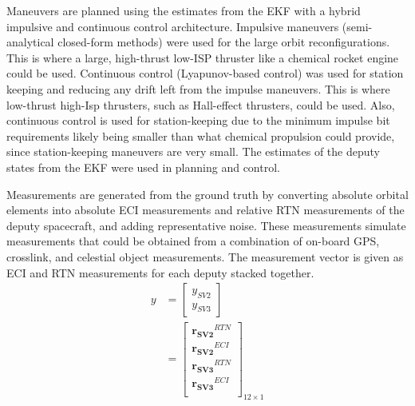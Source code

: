 Maneuvers are planned using the estimates from the EKF with a hybrid impulsive and continuous control architecture. Impulsive maneuvers (semi-analytical closed-form methods) were used for the large orbit reconfigurations. This is where a large, high-thrust low-ISP thruster like a chemical rocket engine could be used. Continuous control (Lyapunov-based control) was used for station keeping and reducing any drift left from the impulse maneuvers. This is where low-thrust high-Isp thrusters, such as Hall-effect thrusters, could be used. Also, continuous control is used for station-keeping due to the minimum impulse bit requirements likely being smaller than what chemical propulsion could provide, since station-keeping maneuvers are very small. The estimates of the deputy states from the EKF were used in planning and control.

Measurements are generated from the ground truth by converting absolute orbital elements into absolute ECI measurements and relative RTN measurements of the deputy spacecraft, and adding representative noise. These measurements simulate measurements that could be obtained from a combination of on-board GPS, crosslink, and celestial object measurements. The measurement vector is given as ECI and RTN measurements for each deputy stacked together. 
\begin{align}
    y &= \begin{bmatrix}
        y_{SV2} \\
        y_{SV3}
    \end{bmatrix} \\
    &= \begin{bmatrix}
        \boldsymbol{r_{SV2}}^{RTN}\\
        \boldsymbol{r_{SV2}}^{ECI} \\
        \boldsymbol{r_{SV3}}^{RTN} \\
        \boldsymbol{r_{SV3}}^{ECI} \\
    \end{bmatrix}_{12\times 1}
\end{align}






